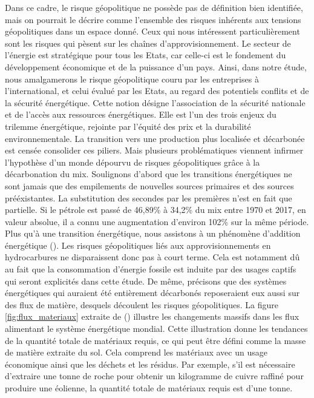 \smallbreak
Dans ce cadre, le risque géopolitique ne possède pas de définition bien identifiée, mais on pourrait le décrire comme l'ensemble des risques inhérents aux tensions géopolitiques dans un espace donné. Ceux qui nous intéressent particulièrement sont les risques qui pèsent sur les chaînes  d'approvisionnement. Le secteur de l'énergie est stratégique pour tous les Etats, car celle-ci est le fondement du développement économique et de la puissance d’un pays. Ainsi, dans notre étude, nous amalgamerons le risque géopolitique couru par les entreprises à l'international, et celui évalué par les Etats, au regard des potentiels conflits et de la sécurité énergétique. Cette notion désigne l'association de la sécurité nationale et de l'accès aux ressources énergétiques. Elle est l'un des trois enjeux du trilemme énergétique, rejointe par l'équité des prix et la durabilité environnementale. La transition vers une production plus localisée et décarbonée est censée consolider ces piliers.
\smallbreak
Mais plusieurs problématiques viennent infirmer l'hypothèse d'un monde dépourvu de risques géopolitiques grâce à la décarbonation du mix. Soulignons d'abord que les transitions énergétiques ne sont jamais que des empilements de nouvelles sources primaires et des sources prééxistantes. La substitution des secondes par les premières n'est en fait que partielle. Si le pétrole est passé de 46,89\% à 34,2\% du mix entre 1970 et 2017, en valeur absolue, il a connu une augmentation d'environ 102\% sur la même période. Plus qu'à une transition énergétique, nous assistons à un phénomène d'addition énergétique (\cite{hache_vers_2019}). Les risques géopolitiques liés aux approvisionnements en hydrocarbures ne disparaissent donc pas à court terme. Cela est notamment dû au fait que la consommation d'énergie fossile est induite par des usages captifs qui seront explicités dans cette étude. 
\smallbreak
De même, précisons que des systèmes énergétiques qui auraient été entièrement décarbonés reposeraient eux aussi sur des flux de matière, desquels découlent les risques géopolitiques. La figure \ref{fig:flux_materiaux} extraite de (\cite{watari_sustainable_2021}) illustre les changements massifs dans les flux alimentant le système énergétique mondial. 
Cette illustration donne les tendances de la quantité totale de matériaux requis, ce qui peut être défini comme la masse de matière extraite du sol. Cela comprend les matériaux avec un usage économique ainsi que les déchets et les résidus. Par exemple, s'il est nécessaire d'extraire une tonne de roche pour obtenir un kilogramme de cuivre raffiné pour produire une éolienne, la quantité totale de matériaux requis est d'une tonne.\smallbreak
